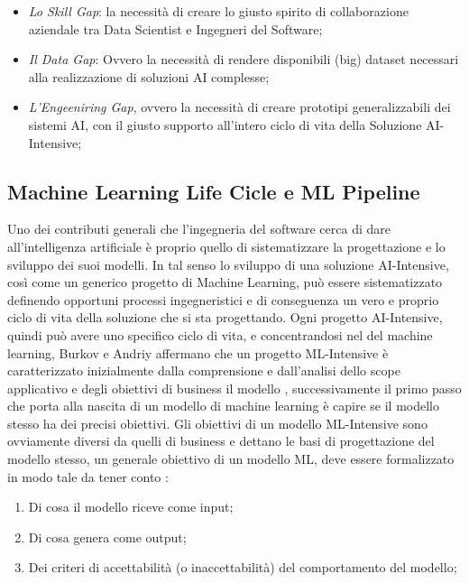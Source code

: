 \begin{itemize}
    \item \emph{Lo Skill Gap}: la necessità di creare lo giusto spirito di collaborazione aziendale tra Data Scientist e Ingegneri del Software;
    \item \emph{Il Data Gap}: Ovvero la necessità di rendere disponibili (big) dataset necessari alla realizzazione di soluzioni AI complesse;
    \item \emph{L'Engeeniring Gap}, ovvero la necessità di creare prototipi generalizzabili dei sistemi AI, con il giusto supporto all'intero ciclo di vita della Soluzione AI-Intensive;
\end{itemize}




\subsection{Machine Learning Life Cicle e ML Pipeline}
Uno dei contributi generali che l'ingegneria del software cerca di dare all'intelligenza artificiale è proprio quello di sistematizzare la progettazione e lo sviluppo dei suoi modelli. In tal senso lo sviluppo di una soluzione AI-Intensive, così come un generico progetto di Machine Learning, può essere sistematizzato definendo opportuni processi ingegneristici e di conseguenza un vero e proprio ciclo di vita della soluzione che si sta progettando. Ogni progetto AI-Intensive, quindi può avere uno specifico ciclo di vita, e concentrandosi nel del machine learning, Burkov e Andriy affermano che un progetto ML-Intensive è caratterizzato inizialmente dalla comprensione e dall'analisi dello scope applicativo e degli obiettivi di business il modello \cite{burkov2020machine}, successivamente il primo passo che porta alla nascita di un modello di machine learning è capire se il modello stesso ha dei precisi obiettivi. Gli obiettivi di un modello ML-Intensive sono ovviamente diversi da quelli di business e dettano le basi di progettazione del modello stesso, un generale obiettivo di un modello ML, deve essere formalizzato in modo tale da tener conto \cite{burkov2020machine}:

\begin{enumerate}
    \item Di cosa il modello riceve come input;
    \item Di cosa genera come output;
    \item Dei criteri di accettabilità (o inaccettabilità) del comportamento del modello;
\end{enumerate}

